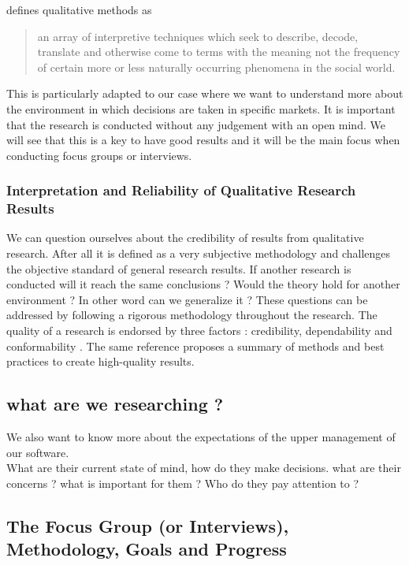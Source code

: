 \documentclass[10pt]{report}
\begin{document}
\autocite{van1979reclaiming} defines qualitative methods as 
\begin{quote}
an array of interpretive techniques which seek to describe, decode, translate and otherwise come to terms with the meaning not the frequency of certain more or less naturally occurring phenomena in the social world.
\end{quote}
This is particularly adapted to our case where we want to understand more about the environment in which decisions are taken in specific markets. It is important that the research is conducted without any judgement with an open mind. We will see that this is a key to have good results and it will be the main focus when conducting focus groups or interviews.

\subsubsection{Interpretation and Reliability of Qualitative Research Results}
We can question ourselves about the credibility of results from qualitative research. After all it is defined as a very subjective methodology and challenges the objective standard of general research results. If another research is conducted will it reach the same conclusions ? Would the theory hold for another environment ? In other word can we generalize it ? These questions can be addressed by following a rigorous methodology throughout the research. The quality of a research is endorsed by three factors : credibility, dependability and conformability \autocite{carson2001}. The same reference proposes a summary of methods and best practices to create high-quality results.







\subsection{what are we researching ?}
We also want to know more about the expectations of the upper management of our software.\\
What are their current state of mind, how do they make decisions. what are their concerns ? what is important for them ? Who do they pay attention to ?


\subsection{The Focus Group (or Interviews), Methodology, Goals and Progress}
\end{document}

